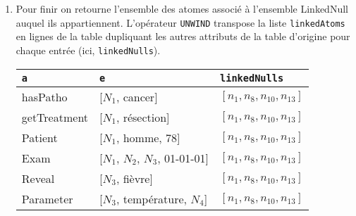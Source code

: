 \begin{example}
\begin{enumerate}[label=\emph{Etape~\arabic*},leftmargin=*]
		\item Pour finir on retourne l'ensemble des atomes associé à l'ensemble \textsf{LinkedNull} auquel ils appartiennent.
		      L'opérateur \verb|UNWIND| transpose la liste \verb|linkedAtoms| en lignes de la table dupliquant les autres attributs de la table d'origine pour chaque entrée (ici, \verb|linkedNulls|).
		      \begin{center}
			      \begin{tabular}{lll}
				      \hline
				      \verb|a|     & \verb|e|                        & \verb|linkedNulls|               \\
				      \hline
				      hasPatho     & [$N_1$, cancer]                 & $[n_{1}, n_{8}, n_{10}, n_{13}]$ \\
				      getTreatment & [$N_1$, résection]              & $[n_{1}, n_{8}, n_{10}, n_{13}]$ \\
				      Patient      & [$N_1$, homme, 78]              & $[n_{1}, n_{8}, n_{10}, n_{13}]$ \\
				      Exam         & [$N_1$, $N_2$, $N_3$, 01-01-01] & $[n_{1}, n_{8}, n_{10}, n_{13}]$ \\
				      Reveal       & [$N_3$, fièvre]                 & $[n_{1}, n_{8}, n_{10}, n_{13}]$ \\
				      Parameter    & [$N_3$, température, $N_4$]     & $[n_{1}, n_{8}, n_{10}, n_{13}]$ \\
				      \hline
			      \end{tabular}
		      \end{center}
	\end{enumerate}
\end{example}

